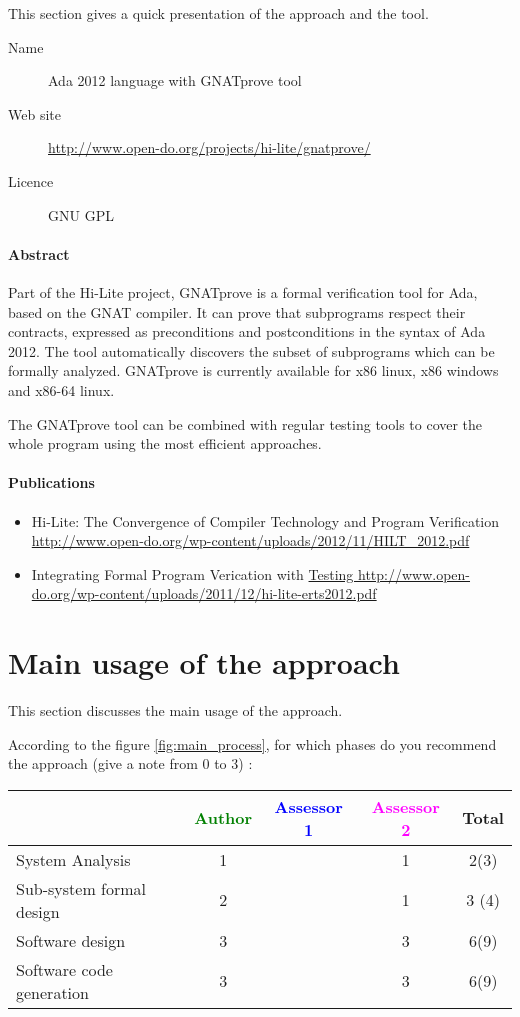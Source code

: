 This section gives a quick presentation of the approach and the tool.

\begin{description}
\item[Name] Ada 2012 language with GNATprove tool
\item[Web site] \url{http://www.open-do.org/projects/hi-lite/gnatprove/}
\item[Licence] GNU GPL
\end{description}

\paragraph{Abstract} Part of the Hi-Lite project, GNATprove is a
formal verification tool for Ada, based on the GNAT compiler. It can
prove that subprograms respect their contracts, expressed as
preconditions and postconditions in the syntax of Ada 2012. The tool
automatically discovers the subset of subprograms which can be
formally analyzed. GNATprove is currently available for x86 linux, x86
windows and x86-64 linux.

The GNATprove tool can be combined with regular testing tools to cover
the whole program using the most efficient approaches.


\paragraph{Publications}
\begin{itemize}
\item Hi-Lite: The Convergence of Compiler Technology and Program
  Verification
  \url{http://www.open-do.org/wp-content/uploads/2012/11/HILT_2012.pdf} 
\item Integrating Formal Program Verication with \url{Testing
  http://www.open-do.org/wp-content/uploads/2011/12/hi-lite-erts2012.pdf}
\end{itemize}



\section{Main usage of the approach}
\label{main_usage}
This section discusses the main usage of the approach.

According to the figure \ref{fig:main_process}, for which phases do you recommend the approach (give a note from 0 to  3) :

\begin{tabular}{|l | c | c | c | c|}
\hline
& \textcolor{green}{Author} & \textcolor{blue}{Assessor 1} & \textcolor{magenta}{Assessor 2} & Total \\
\hline 
System Analysis & 1     & & 1     &  2(3) \\
\hline
Sub-system formal design & 2     & & 1     & 3 (4) \\
\hline
Software design & 3     & & 3     &  6(9) \\
\hline
Software code generation & 3     & & 3     &  6(9) \\
\hline
\end{tabular}

